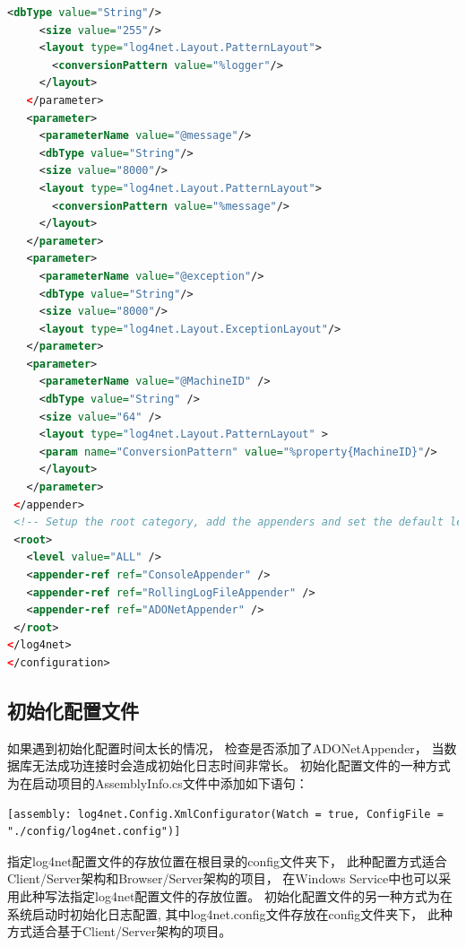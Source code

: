 \documentclass{book}
\begin{document}
\begin{lstlisting}[language=XML]
     <dbType value="String"/>
     <size value="255"/>
     <layout type="log4net.Layout.PatternLayout">
       <conversionPattern value="%logger"/>
     </layout>
   </parameter>
   <parameter>
     <parameterName value="@message"/>
     <dbType value="String"/>
     <size value="8000"/>
     <layout type="log4net.Layout.PatternLayout">
       <conversionPattern value="%message"/>
     </layout>
   </parameter>
   <parameter>
     <parameterName value="@exception"/>
     <dbType value="String"/>
     <size value="8000"/>
     <layout type="log4net.Layout.ExceptionLayout"/>
   </parameter>
   <parameter>
	 <parameterName value="@MachineID" />
	 <dbType value="String" />
 	 <size value="64" />
	 <layout type="log4net.Layout.PatternLayout" >
	 <param name="ConversionPattern" value="%property{MachineID}"/>
	 </layout>
   </parameter>
 </appender>
 <!-- Setup the root category, add the appenders and set the default level -->
 <root>
   <level value="ALL" />
   <appender-ref ref="ConsoleAppender" />
   <appender-ref ref="RollingLogFileAppender" />
   <appender-ref ref="ADONetAppender" />
 </root>
</log4net>  
</configuration>\end{lstlisting}

\subsection{初始化配置文件}

如果遇到初始化配置时间太长的情况，
检查是否添加了ADONetAppender，
当数据库无法成功连接时会造成初始化日志时间非常长。
初始化配置文件的一种方式为在启动项目的AssemblyInfo.cs文件中添加如下语句：
\begin{lstlisting}[language={[Sharp]C}]
[assembly: log4net.Config.XmlConfigurator(Watch = true, ConfigFile = "./config/log4net.config")]
\end{lstlisting}
指定log4net配置文件的存放位置在根目录的config文件夹下，
此种配置方式适合Client/Server架构和Browser/Server架构的项目，
在Windows Service中也可以采用此种写法指定log4net配置文件的存放位置。
初始化配置文件的另一种方式为在系统启动时初始化日志配置,
其中log4net.config文件存放在config文件夹下，
此种方式适合基于Client/Server架构的项目。
\end{document}
